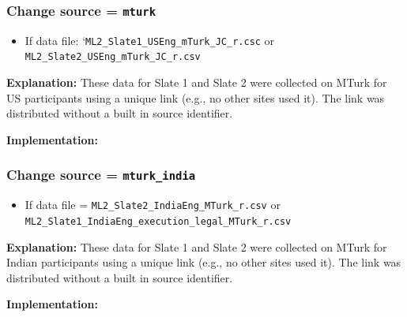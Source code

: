 \documentclass[]{article}
\newenvironment{Shaded}{\begin{snugshade}}{\end{snugshade}}
\newcommand{\DecValTok}[1]{\textcolor[rgb]{0.86,0.86,0.80}{{#1}}}
\newcommand{\StringTok}[1]{\textcolor[rgb]{0.80,0.58,0.58}{{#1}}}
\newcommand{\CommentTok}[1]{\textcolor[rgb]{0.50,0.62,0.50}{{#1}}}
\newcommand{\NormalTok}[1]{\textcolor[rgb]{0.80,0.80,0.80}{{#1}}}
\begin{document}
\subsubsection{\textbf{Change} source =
\texttt{mturk}}\label{change-source-mturk}

\begin{itemize}
\itemsep1pt\parskip0pt
\item
  If data file: `\texttt{ML2\_Slate1\_USEng\_mTurk\_JC\_r.csc} or
  \texttt{ML2\_Slate2\_USEng\_mTurk\_JC\_r.csv}
\end{itemize}

\textbf{Explanation:} These data for Slate 1 and Slate 2 were collected
on MTurk for US participants using a unique link (e.g., no other sites
used it). The link was distributed without a built in source identifier.

\textbf{Implementation:}

\begin{Shaded}
\end{Shaded}

\subsubsection{\textbf{Change} source =
\texttt{mturk\_india}}\label{change-source-mturkux5findia}

\begin{itemize}
\itemsep1pt\parskip0pt
\item
  If data file = \texttt{ML2\_Slate2\_IndiaEng\_MTurk\_r.csv} or
  \texttt{ML2\_Slate1\_IndiaEng\_execution\_legal\_MTurk\_r.csv}
\end{itemize}

\textbf{Explanation:} These data for Slate 1 and Slate 2 were collected
on MTurk for Indian participants using a unique link (e.g., no other
sites used it). The link was distributed without a built in source
identifier.

\textbf{Implementation:}

\begin{Shaded}
\end{Shaded}
\end{document}
